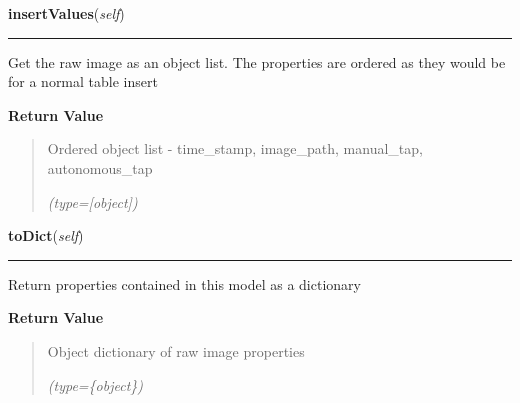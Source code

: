 \hspace{.8\funcindent}\begin{boxedminipage}{\funcwidth}

    \raggedright \textbf{insertValues}(\textit{self})

    \vspace{-1.5ex}

    \rule{\textwidth}{0.5\fboxrule}
\setlength{\parskip}{2ex}
    Get the raw image as an object list. The properties are ordered as they
    would be for a normal table insert

\setlength{\parskip}{1ex}
      \textbf{Return Value}
    \vspace{-1ex}

      \begin{quote}
      Ordered object list - time\_stamp, image\_path, manual\_tap, 
      autonomous\_tap

      {\it (type=[object])}

      \end{quote}

    \end{boxedminipage}

    \label{src:dao:model:incoming_image:incoming_image:toDict}

    \vspace{0.5ex}

\hspace{.8\funcindent}\begin{boxedminipage}{\funcwidth}

    \raggedright \textbf{toDict}(\textit{self})

    \vspace{-1.5ex}

    \rule{\textwidth}{0.5\fboxrule}
\setlength{\parskip}{2ex}
    Return properties contained in this model as a dictionary

\setlength{\parskip}{1ex}
      \textbf{Return Value}
    \vspace{-1ex}

      \begin{quote}
      Object dictionary of raw image properties

      {\it (type=\{object\})}

      \end{quote}

    \end{boxedminipage}

